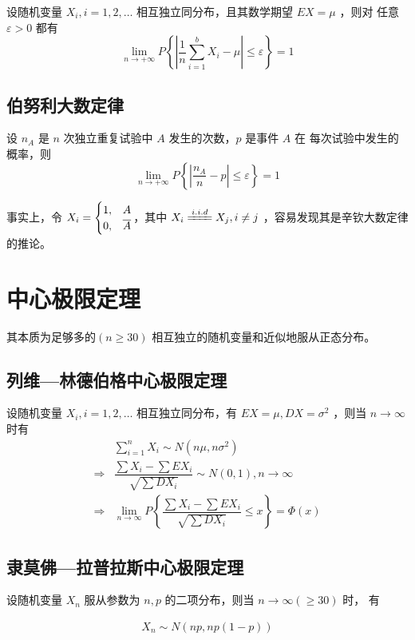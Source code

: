 设随机变量 $ X_i,i=1,2,\dots $ 相互独立同分布，且其数学期望 $ EX = \mu $ ，则对
任意 $ \varepsilon > 0 $ 都有
$$
    {\displaystyle\lim_{n\rightarrow +\infty}}P\left\{
        \left|\dfrac{1}{n}\sum_{i=1}^bX_i - \mu\right|\leq \varepsilon
    \right\} = 1
$$ 

\subsection{伯努利大数定律}

设 $ n_A $ 是 $ n $ 次独立重复试验中 $ A $ 发生的次数，$ p $ 是事件 $ A $ 在
每次试验中发生的概率，则
$$
    {\displaystyle\lim_{n\rightarrow +\infty}}P\left\{
        \left|\dfrac{n_A}{n} - p\right|\leq \varepsilon
    \right\} = 1
$$ 

事实上，令 $ \displaystyle X_i = \begin{cases}
    1,&A\\0,&\overline A
\end{cases} $，其中 $ X_i\xlongequal{i.i.d}X_j,i\neq j $ ，容易发现其是辛钦大数定律的推论。

\section{中心极限定理}

其本质为足够多的$ (n\geq30) $ 相互独立的随机变量和近似地服从正态分布。

\subsection{列维—林德伯格中心极限定理}

设随机变量 $ X_i,i=1,2,\dots $ 相互独立同分布，有 $ EX=\mu,DX = \sigma^2 $ ，则当
$ n\rightarrow\infty $ 时有
\begin{equation*}
    \begin{aligned}
        &\sum_{i=1}^nX_i\sim N(n\mu,n\sigma^2)\\\Rightarrow&
        \dfrac{\sum X_i-\sum EX_i}{\sqrt{\sum DX_i}}\sim N(0,1),n\rightarrow\infty
        \\\Rightarrow&{\displaystyle\lim_{n\rightarrow \infty}}
        P\left\{
            \dfrac{\sum X_i-\sum EX_i}{\sqrt{\sum DX_i}}\leq x
        \right\}=\Phi(x)
    \end{aligned}
\end{equation*}

\subsection{隶莫佛—拉普拉斯中心极限定理}

设随机变量 $ X_n $ 服从参数为 $ n,p $ 的二项分布，则当 $ n\rightarrow\infty(\geq30) $ 时，
有

\begin{equation*}
    \begin{aligned}
        X_n\sim N(np,np(1-p))
    \end{aligned}
\end{equation*}

